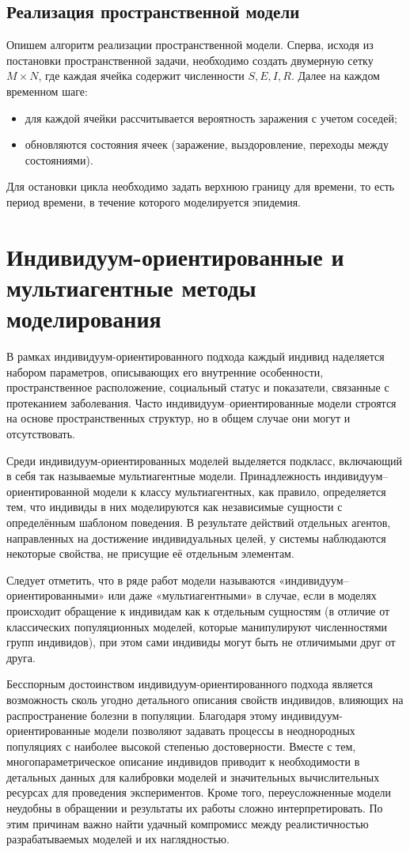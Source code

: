 \documentclass[a4paper, 14pt]{extreport}
\begin{document}
	\subsection{Реализация пространственной модели}
	Опишем алгоритм реализации пространственной модели.
	Сперва, исходя из постановки пространственной задачи, необходимо создать двумерную сетку $M\times N$, где каждая ячейка содержит численности $S,E,I,R$. Далее на каждом временном шаге:
	\begin{itemize}
		\item для каждой ячейки рассчитывается вероятность заражения с учетом соседей;
		\item обновляются состояния ячеек (заражение, выздоровление, переходы между состояниями).
	\end{itemize}
	Для остановки цикла необходимо задать верхнюю границу для времени, то есть период времени, в течение которого моделируется эпидемия.
	\section{Индивидуум-ориентированные и мультиагентные методы моделирования}
	В рамках индивидуум-ориентированного подхода каждый
	индивид наделяется набором параметров, описывающих его внутренние
	особенности, пространственное расположение, социальный статус и показатели,
	связанные с протеканием заболевания. Часто индивидуум–ориентированные
	модели строятся на основе пространственных структур, но в общем случае они
	могут и отсутствовать.
	
	Среди индивидуум-ориентированных моделей выделяется подкласс,
	включающий в себя так называемые мультиагентные модели. Принадлежность
	индивидуум–ориентированной модели к классу мультиагентных, как правило,
	определяется тем, что индивиды в них моделируются как независимые сущности с определённым шаблоном поведения. В результате действий
	отдельных агентов, направленных на достижение индивидуальных целей, у
	системы наблюдаются некоторые свойства, не присущие её отдельным
	элементам.
	
	Следует отметить, что в ряде работ модели называются «индивидуум–
	ориентированными» или даже «мультиагентными» в случае, если в моделях
	происходит обращение к индивидам как к отдельным сущностям (в отличие от
	классических популяционных моделей, которые манипулируют численностями
	групп индивидов), при этом сами индивиды могут быть не отличимыми друг от
	друга.
	
	Бесспорным достоинством индивидуум-ориентированного подхода является возможность сколь угодно детального
	описания свойств индивидов, влияющих на распространение болезни в
	популяции. Благодаря этому индивидуум-ориентированные модели позволяют
	задавать процессы в неоднородных популяциях с наиболее высокой степенью
	достоверности. Вместе с тем, многопараметрическое описание индивидов
	приводит к необходимости в детальных данных для калибровки моделей и
	значительных вычислительных ресурсах для проведения экспериментов. Кроме
	того, переусложненные модели неудобны в обращении и результаты их работы
	сложно интерпретировать. По этим причинам важно найти удачный
	компромисс между реалистичностью разрабатываемых моделей и их
	наглядностью.
	
\end{document}
